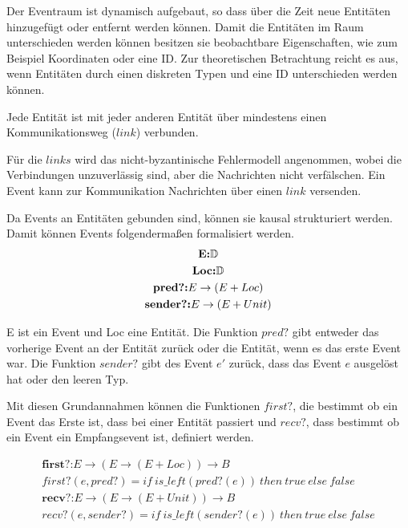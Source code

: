 Der Eventraum ist dynamisch aufgebaut, so dass über die Zeit neue Entitäten
hinzugefügt oder entfernt werden können. Damit die Entitäten im Raum
unterschieden werden können besitzen sie beobachtbare Eigenschaften, wie zum
Beispiel Koordinaten oder eine ID. Zur theoretischen Betrachtung reicht es aus,
wenn Entitäten durch einen diskreten Typen und eine ID unterschieden werden können.~\cite{bickford2005causal}

\begin{defi}
  Jede Entität ist mit jeder anderen Entität über mindestens
  einen Kommunikationsweg ($link$) verbunden.
\end{defi}

Für die $links$ wird das nicht-byzantinische Fehlermodell angenommen,
wobei die Verbindungen unzuverlässig sind, aber die Nachrichten nicht
verfälschen. Ein Event kann zur Kommunikation Nachrichten über einen
$link$ versenden.

Da Events an Entitäten gebunden sind, können sie kausal strukturiert werden.
Damit können Events folgendermaßen formalisiert werden.
\begin{gather*}
  \textbf{E:}\mathbb{D}\notag\\
  \textbf{Loc:}\mathbb{D}\\
  \textbf{pred?:} E\rightarrow (E+Loc)\\
  \textbf{sender?:} E\rightarrow (E+Unit)
\end{gather*}

E ist ein Event und Loc eine Entität. Die Funktion $pred?$ gibt entweder das
vorherige Event an der Entität zurück oder die Entität, wenn es das erste Event
war. Die Funktion $sender?$ gibt des Event $e'$ zurück, dass das Event $e$
ausgelöst hat oder den leeren Typ.~\cite{bickford2005causal}

Mit diesen Grundannahmen können die Funktionen $first?$, die bestimmt ob
ein Event das Erste ist, dass bei einer Entität passiert und $recv?$,
dass bestimmt ob ein Event ein Empfangsevent ist, definiert werden.

\begin{gather*}
  \textbf{first?:}E\rightarrow (E\rightarrow (E+Loc))\rightarrow B\\
  first?(e,pred?) = if\ is\_left(pred?(e))\ then\ true\ else\ false\\
  \textbf{recv?:}E\rightarrow (E\rightarrow (E+Unit))\rightarrow B\\
  recv?(e,sender?) = if\ is\_left(sender?(e))\ then\ true\ else\ false\\
\end{gather*}

